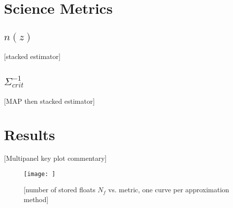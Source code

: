 \documentclass[\docopts]{\docclass}
\begin{document}
\section{Science Metrics}
\label{sec:science}

\subsection{$n(z)$}
\label{sec:nz}

[stacked estimator]

\subsection{$\Sigma_{crit}^{-1}$}
\label{sec:sigma}

[MAP then stacked estimator]


\section{Results}
\label{sec:results}

%

[Multipanel key plot commentary]

\begin{figure}
\texttt{[image: ]}
\caption{[number of stored floats $N_{f}$ vs. metric, one curve per approximation method]\label{fig:results}}
\end{figure}


%
\end{document}
